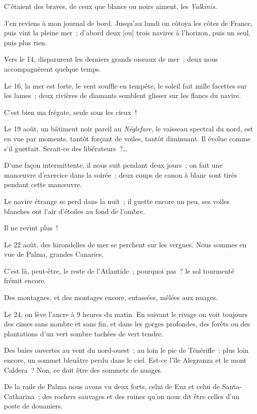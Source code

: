 \documentclass[french,twoside]{book} %
\newcommand\corr[1]{#1}
\begin{document}
C’étaient des braves, de ceux que blancs ou noirs aiment, les \emph{Valkinis}.\par
J’en reviens à mon journal de bord. Jusqu’au lundi on côtoya les côtes de France, puis vint la pleine mer ; d’abord deux [{\corr ou}] trois navires à l’horizon, puis un seul, puis plus rien.\par
Vers le 14, disparurent les derniers grands oiseaux de mer ; deux nous accompagnèrent quelque temps.\par
 Le 16, la mer est forte, le vent souffle en tempête, le soleil fait mille facettes sur les lames ; deux rivières de diamants semblent glisser sur les flancs du navire.\par
C’est bien ma frégate, seule sous les cieux !\par
Le 19 août, un bâtiment noir pareil au \emph{Néglefare}, le vaisseau spectral du nord, est en vue par moments, tantôt forçant de voiles, tantôt diminuant. Il évolue comme s’il guettait. Serait-ce des libérateurs ?…\par
D’une façon intermittente, il nous suit pendant deux jours ; on fait une manœuvre d’exercice dans la soirée ; deux coups de canon à blanc sont tirés pendant cette manœuvre.\par
Le navire étrange se perd dans la nuit ; il guette encore un peu, ses voiles blanches ont l’air d’étoiles au fond de l’ombre.\par
Il ne revint plus !\par
Le 22 août, des hirondelles de mer se perchent sur les vergues. Nous sommes en vue de Palma, grandes Canaries.\par
C’est là, peut-être, le reste de l’Atlantide ; pourquoi pas ? le sol tourmenté frémit encore.\par
Des montagnes, et des montages encore, entassées, mêlées aux nuages.\par
Le 24, on lève l’ancre à 9 heures du matin. En suivant le rivage on voit toujours des cimes sans  nombre et sans fin, et dans les gorges profondes, des forêts ou des plantations d’un vert sombre tachées de vert tendre.\par
Des baies ouvertes au vent du nord-ouest ; au loin le pic de Ténériffe ; plus loin encore, un sommet bleuâtre perdu dans le ciel. Est-ce l’île Alegranza et le mont Caldera ? Non, ce doit être des sommets de nuages.\par
De la rade de Palma nous avons vu deux forts, celui de Euz et celui de Santa-Catharina ; des rochers sauvages et des ruines qu’on nous dit être celles d’un poste de douaniers.\par
\end{document}
